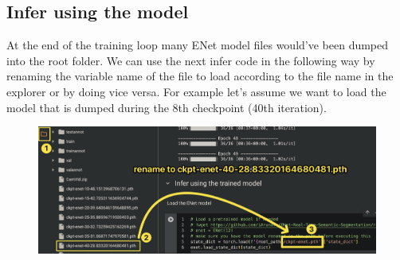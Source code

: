\subsection*{Infer using the model}
At the end of the training loop many ENet model files would've been dumped into the root folder. We can use the next infer code in the following way by renaming the variable name of the file to load according to the file name in the explorer or by doing vice versa. For example let's assume we want to load the model that is dumped during the 8th checkpoint (40th iteration).
\begin{figure}[H]
    \centering
    \includegraphics[width=450pt]{assets/enet/camvid/loadenet.png}
    \label{fig:using:test2}
\end{figure}

